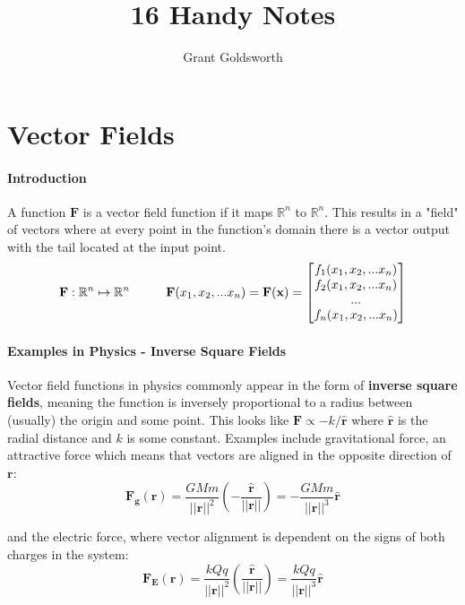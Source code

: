 \documentclass{article}
\title{16 Handy Notes}
\author{Grant Goldsworth}
\date{}
\begin{document}
\maketitle

\newcommand{\parf}[2]{\frac{\partial #1}{\partial #2}}

\section*{Vector Fields}
\paragraph{Introduction} A function $\mathbf{F}$ is a vector field function if it maps $\mathbb{R}^n$ to $\mathbb{R}^n$. This results in a "field" of vectors where at every point in the function's domain there is a vector output with the tail located at the input point.
\[ 
    \mathbf{F}: \mathbb{R}^n \mapsto \mathbb{R}^n \hspace{.4in}
    \mathbf{F}(x_1,x_2,...x_n) = \mathbf{F}(\mathbf{x}) = 
    \begin{bmatrix}
        f_1(x_1,x_2,...x_n) \\
        f_2(x_1,x_2,...x_n) \\
        ... \\
        f_n(x_1,x_2,...x_n)
    \end{bmatrix}
\]
\paragraph{Examples in Physics - Inverse Square Fields} Vector field functions in physics commonly appear in the form of \textbf{inverse square fields}, meaning the function is inversely proportional to a radius between (usually) the origin and some point. This looks like $\mathbf{F} \propto -k/\mathbf{\hat{r}}$ where $\mathbf{\hat{r}}$ is the radial distance and $k$ is some constant. Examples include gravitational force, an attractive force which means that vectors are aligned in the opposite direction of $\mathbf{r}$:
\[ \mathbf{F_g}(\mathbf{r}) = \frac{GMm}{||\mathbf{r}||^2}(-\frac{\mathbf{\hat{r}}}{||\mathbf{r}||}) = -\frac{GMm}{||\mathbf{r}||^3}\mathbf{\hat{r}}\]

and the electric force, where vector alignment is dependent on the signs of both charges in the system:
\[ \mathbf{F_E}(\mathbf{r}) = \frac{kQq}{||\mathbf{r}||^2}(\frac{\mathbf{\hat{r}}}{||\mathbf{r}||}) = \frac{kQq}{||\mathbf{r}||^3}\mathbf{\hat{r}}\]
\end{document}
